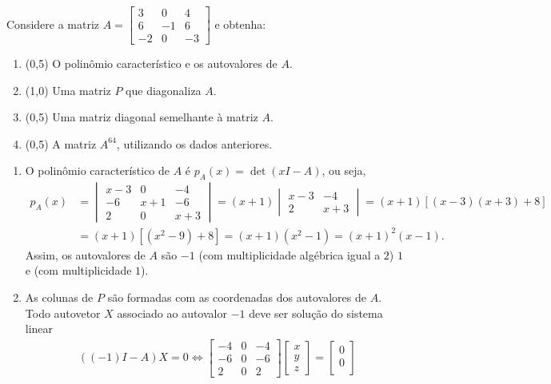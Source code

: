 \documentclass[12pt,a4paper]{article}
\begin{document}
\begin{ExerciseList}
\Exercise[title={2,5}] Considere a matriz $A =
\begin{bmatrix}
 3 &  0 &  4\\
 6 & -1 &  6\\
-2 &  0 & -3
\end{bmatrix}$ e obtenha:
\begin{enumerate}
\item (0,5) O polinômio característico e os autovalores de $A$.
\item (1,0) Uma matriz $P$ que diagonaliza $A$.
\item (0,5) Uma matriz diagonal semelhante à matriz $A$.
\item (0,5) A matriz $A^{64}$, utilizando os dados anteriores.
\end{enumerate}
\Answer
\begin{enumerate}
\item O polinômio característico de $A$ é $p_A(x) = \det{(xI-A)}$, ou seja,
\begin{align*}
p_A(x)
& =
\begin{vmatrix}
 x-3 &  0  &  -4\\
  -6 & x+1 &  -6\\
   2 &  0  & x+3
\end{vmatrix}
= (x+1)
\begin{vmatrix}
x-3 &  -4\\
  2 & x+3
\end{vmatrix}
 = (x+1)[ (x-3)(x+3)+ 8 ]\\
&= (x+1)[ (x^2 - 9) + 8 ]
 = (x+1)(x^2-1)
 = (x+1)^2(x-1).
\end{align*}
Assim, os autovalores de $A$ são $-1$ (com multiplicidade algébrica igual a $2$) $1$ e (com multiplicidade $1$).
\item As colunas de $P$ são formadas com as coordenadas dos autovalores de $A$. Todo autovetor $X$ associado ao autovalor $-1$ deve ser solução do sistema linear
\begin{align*}
((-1)I - A)X = 0
\Leftrightarrow
\begin{bmatrix}
-4 & 0 & -4\\
-6 & 0 & -6\\
 2 & 0 &  2
\end{bmatrix}
\begin{bmatrix}
x\\
y\\
z
\end{bmatrix}
=
\begin{bmatrix}
0\\
0\\

\end{bmatrix}
\end{align*}
\end{enumerate}
\end{ExerciseList}
\end{document}
